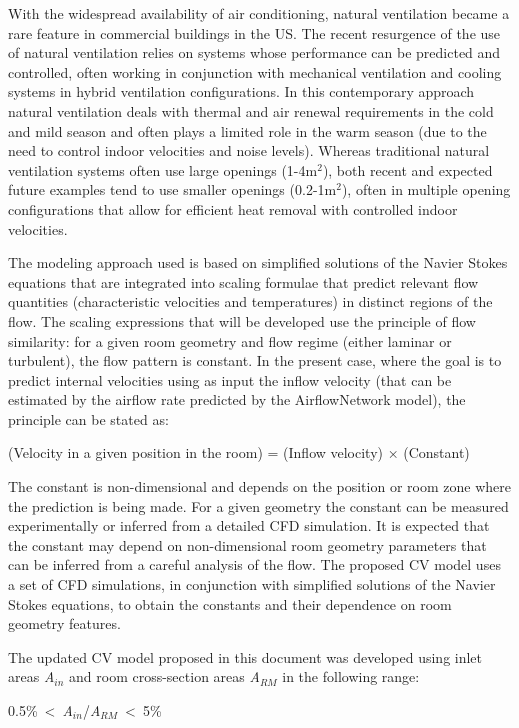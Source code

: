 {With the widespread availability of air conditioning, natural ventilation became a rare feature in commercial buildings in the US. The recent resurgence of the use of natural ventilation relies on systems whose performance can be predicted and controlled, often working in conjunction with mechanical ventilation and cooling systems in hybrid ventilation configurations. In this contemporary approach natural ventilation deals with thermal and air renewal requirements in the cold and mild season and often plays a limited role in the warm season (due to the need to control indoor velocities and noise levels). Whereas traditional natural ventilation systems often use large openings (1-4m\(^{2}\)), both recent and expected future examples tend to use smaller openings (0.2-1m\(^{2}\)), often in multiple opening configurations that allow for efficient heat removal with controlled indoor velocities.

The modeling approach used is based on simplified solutions of the Navier Stokes equations that are integrated into scaling formulae that predict relevant flow quantities (characteristic velocities and temperatures) in distinct regions of the flow. The scaling expressions that will be developed use the principle of flow similarity: for a given room geometry and flow regime (either laminar or turbulent), the flow pattern is constant. In the present case, where the goal is to predict internal velocities using as input the inflow velocity (that can be estimated by the airflow rate predicted by the AirflowNetwork model), the principle can be stated as:

(Velocity in a given position in the room) = (Inflow velocity) × (Constant)

The constant is non-dimensional and depends on the position or room zone where the prediction is being made. For a given geometry the constant can be measured experimentally or inferred from a detailed CFD simulation. It is expected that the constant may depend on non-dimensional room geometry parameters that can be inferred from a careful analysis of the flow. The proposed CV model uses a set of CFD simulations, in conjunction with simplified solutions of the Navier Stokes equations, to obtain the constants and their dependence on room geometry features.

The updated CV model proposed in this document was developed using inlet areas \emph{A}\(_{in}\) and room cross-section areas \emph{A}\(_{RM}\) in the following range:

0.5\%~\textless{}~\emph{A}\(_{in}\)/\emph{A}\(_{RM}\)~\textless{}~5\%

}
